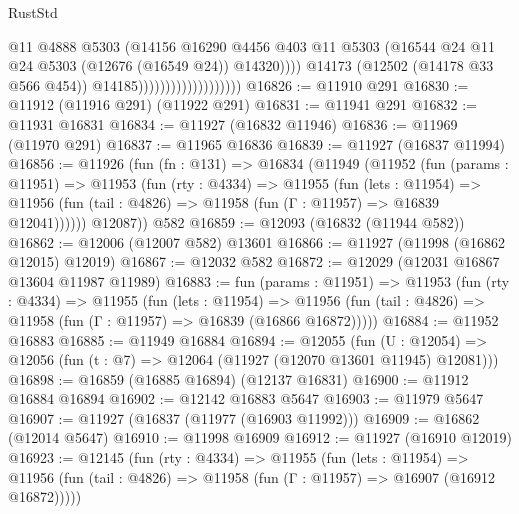 \begin{lexlean}{RustStd}
\begin{coremodule}
                                              @11
                                              @4888
                                              @5303
                                              (@14156
                                                @16290
                                                @4456
                                                @403
                                                @11
                                                @5303
                                                (@16544
                                                  @24
                                                  @11
                                                  @24
                                                  @5303
                                                  (@12676 (@16549 @24))
                                                  @14320))))
                                          @14173
                                          (@12502 (@14178 @33 @566 @454))
                                          @14185)))))))))))))))))))
@16826 := @11910 @291
@16830 := @11912 (@11916 @291) (@11922 @291)
@16831 := @11941 @291
@16832 := @11931 @16831
@16834 := @11927 (@16832 @11946)
@16836 := @11969 (@11970 @291)
@16837 := @11965 @16836
@16839 := @11927 (@16837 @11994)
@16856 := @11926
    (fun (fn : @131) =>
    @16834
      (@11949
        (@11952
          (fun (params : @11951) =>
          @11953
            (fun (rty : @4334) =>
            @11955
              (fun (lets : @11954) =>
              @11956 (fun (tail : @4826) => @11958 (fun (Γ : @11957) => @16839 @12041))))))
        @12087))
    @582
@16859 := @12093 (@16832 (@11944 @582))
@16862 := @12006 (@12007 @582) @13601
@16866 := @11927 (@11998 (@16862 @12015) @12019)
@16867 := @12032 @582
@16872 := @12029 (@12031 @16867 @13604 @11987 @11989)
@16883 := fun (params : @11951) =>
  @11953
    (fun (rty : @4334) =>
    @11955
      (fun (lets : @11954) =>
      @11956 (fun (tail : @4826) => @11958 (fun (Γ : @11957) => @16839 (@16866 @16872)))))
@16884 := @11952 @16883
@16885 := @11949 @16884
@16894 := @12055
    (fun (U : @12054) => @12056 (fun (t : @7) => @12064 (@11927 (@12070 @13601 @11945) @12081)))
@16898 := @16859 (@16885 @16894) (@12137 @16831)
@16900 := @11912 @16884 @16894
@16902 := @12142 @16883 @5647
@16903 := @11979 @5647
@16907 := @11927 (@16837 (@11977 (@16903 @11992)))
@16909 := @16862 (@12014 @5647)
@16910 := @11998 @16909
@16912 := @11927 (@16910 @12019)
@16923 := @12145
    (fun (rty : @4334) =>
    @11955
      (fun (lets : @11954) =>
      @11956 (fun (tail : @4826) => @11958 (fun (Γ : @11957) => @16907 (@16912 @16872)))))

\end{coremodule}
\end{lexlean}
